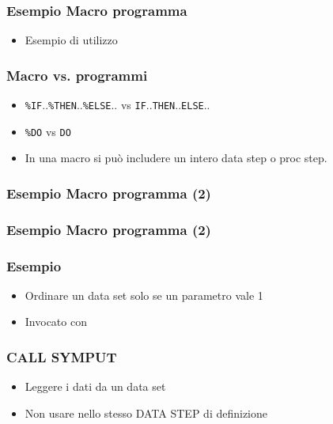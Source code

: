 \begin{frame}[containsverbatim]\frametitle{Esempio Macro programma}
  \begin{itemize}
  \item
    Esempio di utilizzo
  \end{itemize}
\end{frame}





\begin{frame}[containsverbatim]\frametitle{Macro vs. programmi}
  \begin{itemize}
  \item
    \verb+%IF+..\verb+%THEN+..\verb+%ELSE+.. vs \verb+IF+..\verb+THEN+..\verb+ELSE+..
  \item
    \verb+%DO+ vs \verb+DO+
  \item
    In una macro si pu{\`o} includere un intero data step o proc step.
  \end{itemize}
\end{frame}

\begin{frame}[containsverbatim]\frametitle{Esempio Macro programma (2)}
\end{frame}

\begin{frame}[containsverbatim]\frametitle{Esempio Macro programma (2)}
\end{frame}


\begin{frame}[containsverbatim]\frametitle{Esempio}
  \begin{itemize}
  \item
    Ordinare un data set solo se un parametro vale 1
  \end{itemize}
  \begin{itemize}
  \item
    Invocato con
  \end{itemize}
\end{frame}



\begin{frame}[containsverbatim]\frametitle{CALL SYMPUT}
  \begin{itemize}
  \item
    Leggere i dati da un data set
  \item
    Non usare nello stesso DATA STEP di definizione
  \end{itemize}
\end{frame}


